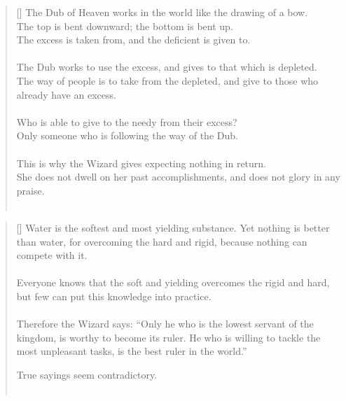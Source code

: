 \documentclass{article}
\begin{document}
\settowidth{\versewidth}{The Wizard leads byemptying people’s minds, filling their bellies, weakening their am- bitions, and making them become strong}
\begin{verse}[\versewidth]
The Dub of Heaven works in the world like the drawing of a bow.\\
The top is bent downward; the bottom is bent up.\\
The excess is taken from, and the deficient is given to.\\
\hfill\\
The Dub works to use the excess, and gives to that which is depleted.\\
The way of people is to take from the depleted, and give to those who already have an excess.\\
\hfill\\
Who is able to give to the needy from their excess?\\
Only someone who is following the way of the Dub.\\
\hfill\\
This is why the Wizard gives expecting nothing in return.\\
She does not dwell on her past accomplishments, and does not glory in any praise.\\
\hfill\\
\end{verse}

\settowidth{\versewidth}{The Wizard leads byemptying people’s minds, filling their bellies, weakening their am- bitions, and making them become strong}
\begin{verse}[\versewidth]
Water is the softest and most yielding substance. 
Yet nothing is better than water, for overcoming the hard and rigid, because nothing can compete with it.\\
\hfill\\
Everyone knows that the soft and yielding overcomes the rigid and hard, but few can put this knowledge into practice.\\
\hfill\\
Therefore the Wizard says:
``Only he who is the lowest servant of the kingdom, is worthy to become its ruler. He who is willing to tackle the most unpleasant tasks, is the best ruler in the world.''

True sayings seem contradictory.\\
\hfill\\
\end{verse}
\end{document}
